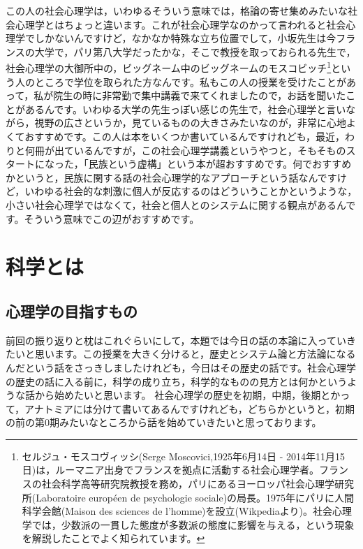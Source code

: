 \documentclass{ltjsbook}
\begin{document}
この人の社会心理学は，いわゆるそういう意味では，格論の寄せ集めみたいな社会心理学とはちょっと違います。これが社会心理学なのかって言われると社会心理学でしかないんですけど，なかなか特殊な立ち位置でして，小坂先生は今フランスの大学で，パリ第八大学だったかな，そこで教授を取っておられる先生で，社会心理学の大御所中の，ビッグネーム中のビッグネームのモスコビッチ\footnote{セルジュ・モスコヴィッシ(Serge Moscovici,1925年6月14日 - 2014年11月15日)は，ルーマニア出身でフランスを拠点に活動する社会心理学者。フランスの社会科学高等研究院教授を務め，パリにあるヨーロッパ社会心理学研究所(Laboratoire européen de psychologie sociale)の局長。1975年にパリに人間科学会館(Maison des sciences de l’homme)を設立(Wikpediaより)。社会心理学では，少数派の一貫した態度が多数派の態度に影響を与える，という現象を解説したことでよく知られています。}という人のところで学位を取られた方なんです。私もこの人の授業を受けたことがあって，私が院生の時に非常勤で集中講義で来てくれましたので，お話を聞いたことがあるんです。いわゆる大学の先生っぽい感じの先生で，社会心理学と言いながら，視野の広さというか，見ているものの大きさみたいなのが，非常に心地よくておすすめです。この人は本をいくつか書いているんですけれども，最近，わりと何冊が出ているんですが，この社会心理学講義というやつと，そもそものスタートになった，「民族という虚構」という本\parencite{kosakai2}が超おすすめです。何でおすすめかというと，民族に関する話の社会心理学的なアプローチという話なんですけど，いわゆる社会的な刺激に個人が反応するのはどういうことかというような，小さい社会心理学ではなくて，社会と個人とのシステムに関する観点があるんです。そういう意味でこの辺がおすすめです。

\section{科学とは}
\subsection{心理学の目指すもの}
前回の振り返りと枕はこれぐらいにして，本題では今日の話の本論に入っていきたいと思います。この授業を大きく分けると，歴史とシステム論と方法論になるんだという話をさっきしましたけれども，今日はその歴史の話です。社会心理学の歴史の話に入る前に，科学の成り立ち，科学的なものの見方とは何かというような話から始めたいと思います。
社会心理学の歴史を初期，中期，後期とかって，アナトミア\parencite{anatomia}には分けて書いてあるんですけれども，どちらかというと，初期の前の第0期みたいなところから話を始めていきたいと思っております。
\end{document}

